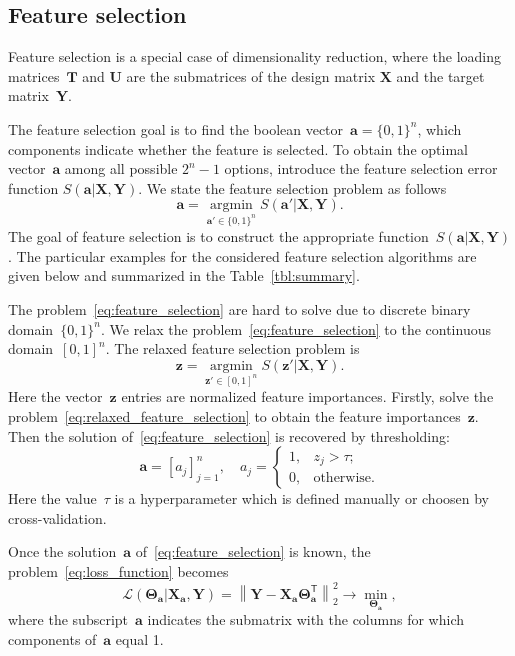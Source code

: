\documentclass[12pt,oneside]{article}
\theoremstyle{definition}
\newcommand{\ba}{\mathbf{a}}
\newcommand{\bz}{\mathbf{z}}
\newcommand{\bY}{\mathbf{Y}}
\newcommand{\bX}{\mathbf{X}}
\newcommand{\bT}{\mathbf{T}}
\newcommand{\bU}{\mathbf{U}}
\newcommand{\T}{\mathsf{T}}
\newcommand{\bTheta}{\boldsymbol{\Theta}}
\newcommand{\argmin}{\mathop{\arg \min}\limits}
\begin{document}
 \subsection{Feature selection}
 Feature selection is a special case of dimensionality reduction, where the loading matrices~$\bT$ and $\bU$ are the submatrices of the design matrix $\bX$ and the target matrix~$\bY$.
 
 The feature selection goal is to find the boolean vector~$\ba = \{0, 1\}^n$, which components indicate whether the feature is selected. 
 To obtain the optimal vector~$\ba$ among all possible $2^n - 1$ options, introduce the feature selection error function $S(\ba | \bX, \bY)$. 
 We state the feature selection problem as follows 
\begin{equation}
	\ba = \argmin_{\ba' \in \{0, 1\}^n} S(\ba' | \bX, \bY).
	\label{eq:feature_selection}
\end{equation}
The goal of feature selection is to construct the appropriate function~$S(\ba | \bX, \bY)$. The particular examples for the considered feature selection algorithms are given below and summarized in the Table~\ref{tbl:summary}.

The problem~\eqref{eq:feature_selection} are hard to solve due to discrete binary domain~$\{0, 1\}^n$. We relax the problem~\eqref{eq:feature_selection} to the continuous domain~$[0, 1]^n$. The relaxed feature selection problem is
\begin{equation}
\bz = \argmin_{\bz' \in [0, 1]^n} S(\bz' | \bX, \bY).
\label{eq:relaxed_feature_selection}
\end{equation}
Here the vector~$\bz$ entries are normalized feature importances.
Firstly, solve the problem~\eqref{eq:relaxed_feature_selection} to obtain the feature importances~$\bz$. 
Then the solution of~\eqref{eq:feature_selection} is recovered by thresholding:
\begin{equation}
\ba = [a_j]_{j=1}^n, \quad 
a_j = \begin{cases}
1, & z_j > \tau; \\
0, & \text{otherwise}.
\end{cases}
\end{equation}
Here the value~$\tau$ is a hyperparameter which is defined manually or choosen by cross-validation. 

Once the solution~$\ba$ of~\eqref{eq:feature_selection} is known, the problem~\eqref{eq:loss_function} becomes
\begin{equation}
\mathcal{L}(\bTheta_{\ba} | \bX_{\ba}, \bY) = {\left\| \mathbf{Y} - \bX_{\ba}\bTheta^{\T}_{\ba} \right\| }_2^2 \rightarrow\min_{\bTheta_{\ba}},
\end{equation}
where the subscript~$\ba$ indicates the submatrix with the columns for which components of~$\ba$ equal 1.
\end{document}
